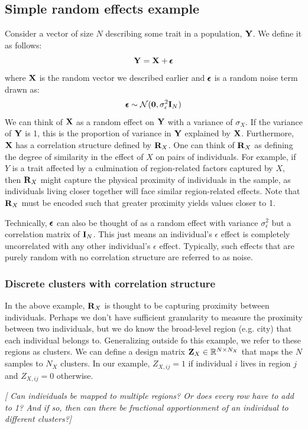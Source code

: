 \documentclass[12pt]{article}
\begin{document}
\subsection{Simple random effects example}
Consider a vector of size $N$ describing some trait in a population, $\mathbf{Y}$.
We define it as follows:
$$\mathbf{Y} = \mathbf{X} + \pmb{\epsilon}$$
where $\mathbf{X}$ is the random vector we described earlier and $\pmb{\epsilon}$ is a random noise term drawn as:
$$ \pmb{\epsilon} \sim \mathcal{N} (\textbf{0}, \sigma_\epsilon^2 \mathbf{I}_N)$$
We can think of $\mathbf{X}$ as a random effect on $\mathbf{Y}$ with a variance of $\sigma_X$.
If the variance of $\mathbf{Y}$ is 1, this is the proportion of variance in $\mathbf{Y}$ explained by $\mathbf{X}$.
Furthermore, $\mathbf{X}$ has a correlation structure defined by $\mathbf{R}_X$.
One can think of $\mathbf{R}_X$ as defining the degree of similarity in the effect of $X$ on pairs of individuals.
For example, if $Y$ is a trait affected by a culmination of region-related factors captured by $X$, then $\mathbf{R}_X$ might capture the physical proximity of individuals in the sample, as individuals living closer together will face similar region-related effects.
Note that $\mathbf{R}_X$ must be encoded such that greater proximity yields values closer to 1.

Technically, $\pmb{\epsilon}$ can also be thought of as a random effect with variance $\sigma_\epsilon^2$ but a correlation matrix of $\mathbf{I}_N$.
This just means an individual's $\epsilon$ effect is completely uncorrelated with any other individual's  $\epsilon$ effect.
Typically, such effects that are purely random with no correlation structure are referred to as noise.

\subsubsection{Discrete clusters with correlation structure}
In the above example, $\mathbf{R}_X$ is thought to be capturing proximity between individuals.
Perhaps we don't have sufficient granularity to measure the proximity between two individuals, but we do know the broad-level region (e.g. city) that each individual belongs to.
Generalizing outside fo this example, we refer to these regions as clusters.
We can define a design matrix $\mathbf{Z}_X \in \mathbb{R}^{N \times N_X}$ that maps the $N$ samples to $N_X$ clusters. In our example,
$Z_{X,ij} = 1$ if individual $i$ lives in region $j$ and $ Z_{X,ij} = 0$ otherwise.

\emph{[ Can individuals be mapped to multiple regions? Or does every row have to add to 1? And if so, then can there be fractional apportionment of an individual to different clusters?] }
\end{document}
